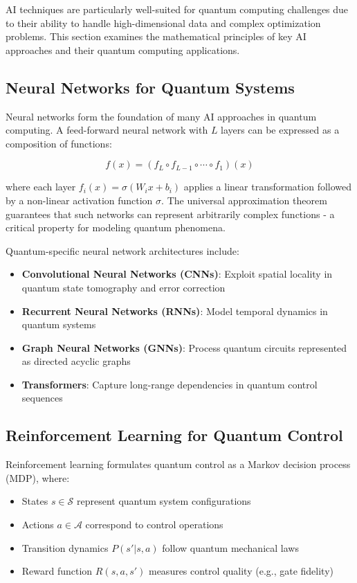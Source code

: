 AI techniques are particularly well-suited for quantum computing challenges due to their ability to handle high-dimensional data and complex optimization problems. This section examines the mathematical principles of key AI approaches and their quantum computing applications.

\subsection{Neural Networks for Quantum Systems}
Neural networks form the foundation of many AI approaches in quantum computing. A feed-forward neural network with $L$ layers can be expressed as a composition of functions:

\begin{equation}
f(x) = (f_L \circ f_{L-1} \circ \cdots \circ f_1)(x)
\end{equation}

where each layer $f_i(x) = \sigma(W_i x + b_i)$ applies a linear transformation followed by a non-linear activation function $\sigma$. The universal approximation theorem \cite{hornik1989multilayer} guarantees that such networks can represent arbitrarily complex functions - a critical property for modeling quantum phenomena.

Quantum-specific neural network architectures include:

\begin{itemize}
    \item \textbf{Convolutional Neural Networks (CNNs)}: Exploit spatial locality in quantum state tomography and error correction
    \item \textbf{Recurrent Neural Networks (RNNs)}: Model temporal dynamics in quantum systems \cite{banchi2018modelling}
    \item \textbf{Graph Neural Networks (GNNs)}: Process quantum circuits represented as directed acyclic graphs
    \item \textbf{Transformers}: Capture long-range dependencies in quantum control sequences
\end{itemize}

\subsection{Reinforcement Learning for Quantum Control}
Reinforcement learning formulates quantum control as a Markov decision process (MDP), where:
\begin{itemize}
    \item States $s \in \mathcal{S}$ represent quantum system configurations
    \item Actions $a \in \mathcal{A}$ correspond to control operations
    \item Transition dynamics $P(s'|s,a)$ follow quantum mechanical laws
    \item Reward function $R(s,a,s')$ measures control quality (e.g., gate fidelity)
\end{itemize}

